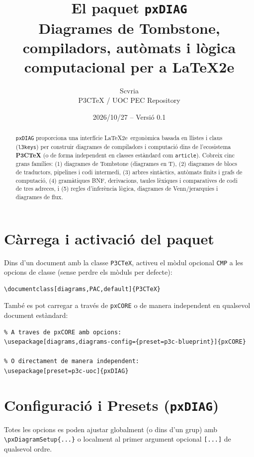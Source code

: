 \documentclass[11pt,a4paper]{article}
\title{El paquet \texttt{pxDIAG}\\
  \large Diagrames de Tombstone, compiladors, aut\`omats i l\`ogica computacional per a \LaTeX2e}
\author{Scvria\\P3CTeX / UOC PEC Repository}
\date{2026/10/27 -- Versi\'o 0.1}
\begin{document}
\maketitle

\begin{abstract}
  \texttt{pxDIAG} proporciona una interf\'icie \LaTeX2e\ ergon\`omica basada en llistes i claus
  (\texttt{l3keys}) per construir diagrames de compiladors i computaci\'o dins de l'ecosistema
  \textbf{P3CTeX} (o de forma independent en classes est\`andard com \texttt{article}).
  Cobreix cinc grans fam\'ilies: (1) diagrames de Tombstone (diagrames en T),
  (2) diagrames de blocs de traductors, pipelines i codi intermedi,
  (3) arbres sint\`actics, aut\`omats finits i grafs de computaci\'o,
  (4) gram\`atiques BNF, derivacions, taules l\`exiques i comparatives de codi de tres adreces,
  i (5) regles d'infer\`encia l\`ogica, diagrames de Venn/jerarquies i diagrames de flux.
\end{abstract}

\tableofcontents
\newpage

\section{C\`arrega i activaci\'o del paquet}

Dins d'un document amb la classe \texttt{P3CTeX}, activeu el m\`odul opcional \texttt{CMP}
a les opcions de classe (sense perdre els m\`oduls per defecte):

\begin{verbatim}
\documentclass[diagrams,PAC,default]{P3CTeX}
\end{verbatim}

Tamb\'e es pot carregar a trav\'es de \texttt{pxCORE} o de manera independent en qualsevol
document est\`andard:

\begin{verbatim}
% A traves de pxCORE amb opcions:
\usepackage[diagrams,diagrams-config={preset=p3c-blueprint}]{pxCORE}

% O directament de manera independent:
\usepackage[preset=p3c-uoc]{pxDIAG}
\end{verbatim}

\section{Configuraci\'o i Presets (\texttt{pxDIAG})}

 Totes les opcions es poden ajustar globalment (o dins d'un grup) amb \verb|\pxDiagramSetup{...}|
o localment al primer argument opcional \verb|[...]| de qualsevol ordre.
\end{document}

